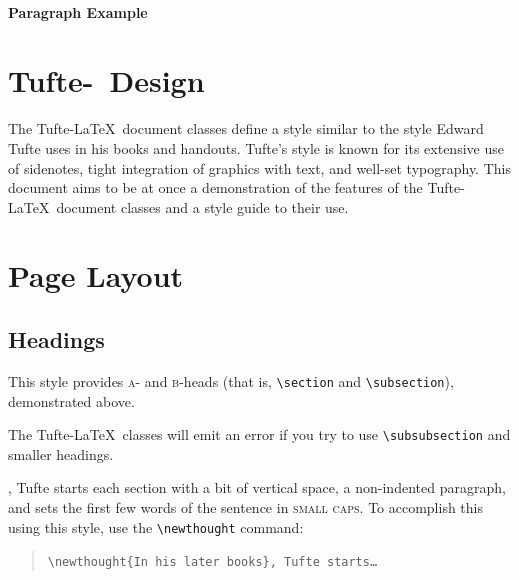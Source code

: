 \documentclass[a4paper]{tufte-handout}
\newcommand{\doccmd}[1]{\texttt{\textbackslash#1}}
\newenvironment{docspec}{\begin{quote}\noindent}{\end{quote}}
\newcommand{\TL}{Tufte-\hologo{LaTeX}\xspace}
\begin{document}
\paragraph{Paragraph Example}

\section{\TL\ Design}
The Tufte-\LaTeX\ document classes define a style similar to the
style Edward Tufte uses in his books and handouts. Tufte's style is known
for its extensive use of sidenotes, tight integration of graphics with
text, and well-set typography. This document aims to be at once a
demonstration of the features of the Tufte-\LaTeX\ document classes
and a style guide to their use.

\section{Page Layout}\label{sec:page-layout}
\subsection{Headings}\label{sec:headings}
This style provides \textsc{a}- and \textsc{b}-heads (that is,
\Verb|\section| and \Verb|\subsection|), demonstrated above.

The Tufte-\LaTeX\ classes will emit an error if you try to use
\linebreak\Verb|\subsubsection| and smaller headings.

,\cite{Tufte2006} Tufte
starts each section with a bit of vertical space, a non-indented paragraph,
and sets the first few words of the sentence in \textsc{small caps}. To
accomplish this using this style, use the \Verb|\newthought| command:  
\begin{docspec}
  \doccmd{newthought\{In his later books\}, Tufte starts\ldots}
\end{docspec}
\end{document}
